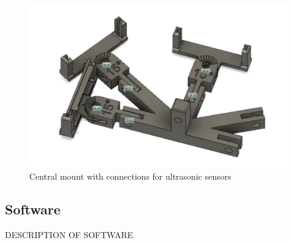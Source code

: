\documentclass[11pt]{article}
\begin{document}
	\begin{figure}[h]
		\centering
		\includegraphics[scale=0.5]{central_mount_conns}
		\caption{Central mount with connections for ultrasonic sensors}
	\end{figure}

	\pagebreak
	
	\subsection{Software}
	DESCRIPTION OF SOFTWARE
	
\end{document}
